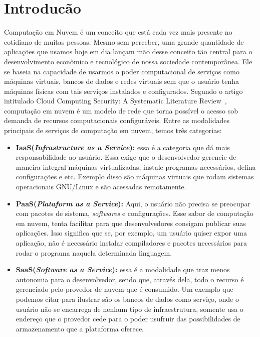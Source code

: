 \documentclass[11pt,twoside]{article}
\begin{document}
\section{Introducão}

Computação em Nuvem é um conceito que está cada vez mais presente no cotidiano de muitas pessoas. Mesmo sem perceber, uma grande quantidade de aplicações que usamos hoje 
em dia lançam mão desse conceito tão central para o desenvolvimento econômico e tecnológico de nossa sociedade contemporânea. Ele se baseia na capacidade de usarmos o
poder computacional de serviços como máquinas virtuais, bancos de dados e redes virtuais sem que o usuário tenha máquinas físicas com tais serviços 
instalados e configurados. Segundo o artigo intitulado Cloud Computing Security: A
Systematic Literature Review~\cite{UPP}, computação em nuvem é um modelo de rede que torna possível o acesso sob demanda de recursos computacionais configuráveis.
Entre as modalidades principais de serviços de computação em nuvem, temos três categorias:

\begin{itemize}

  \item \textbf{IaaS(\emph{Infrastructure as a Service}):} essa é a categoria que dá mais responsabilidade ao usuário. Essa exige que o desenvolvedor gerencie de maneira integral máquinas virtualizadas, 
  instale programas necessários, defina configurações e etc. Exemplo disso são máquinas virtuais que rodam sistemas operacionais GNU/Linux e são acessadas remotamente.
  \item \textbf{PaaS(\emph{Plataform as a Service}):} Aqui, o usuário não precisa se preocupar com pacotes de sistema, \emph{softwares} e configurações. Esse sabor de computação em nuvem, tenta 
  facilitar para que desenvolvedores consigam publicar suas aplicações. Isso significa que se, por exemplo, um usuário quiser expor uma aplicação, não é necessário
  instalar compiladores e pacotes necessários para rodar o programa naquela determinada linguagem.
  \item \textbf{SaaS(\emph{Software as a Service}):} essa é a modalidade que traz menos autonomia para o desenvolvedor, sendo que, através dela, todo o recurso é gerenciado pelo provedor de 
  nuvem que é consumido. Um exemplo que podemos citar para ilustrar são os bancos de dados como serviço, onde o usuário não se encarrega de nenhum tipo de infraestrutura, 
  somente usa o endereço que o provedor cede para o poder usufruir das possibilidades de armazenamento que a plataforma oferece.

\end{itemize}
\end{document}
